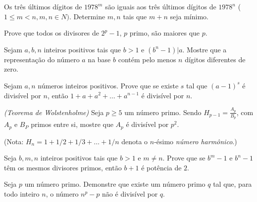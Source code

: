 \begin{questao}
  Os três últimos dígitos de $1978^m$ são iguais aos três
  últimos dígitos de $1978^n$ ($1 \leq m < n, m,n \in
  {N})$. Determine $m,n$ tais que $m+n$ seja mínimo.
\end{questao}

\begin{questao}
  Prove que todos os divisores de $2^p-1$, $p$ primo,
  são maiores que $p$.
\end{questao}

\begin{questao}
  Sejam $a,b,n$ inteiros positivos tais que $b>1$ e
  $(b^n-1)|a$. Mostre que a representação do número $a$ na base
  $b$ contém pelo menos $n$ dígitos diferentes de zero.
\end{questao}

\begin{questao}
  Sejam $a,n$ números inteiros positivos. Prove que se
  existe $s$ tal que $(a-1)^s$ é divisível por $n$, então
  $1+a+a^2+\ldots+a^{n-1}$ é divisível por $n$.
\end{questao}

\begin{questao}
  {\it(Teorema de Wolstenholme)} Seja $p \geq 5$ um número
  primo. Sendo $H_{p-1} = \frac{A_p}{B_p}$, com $A_p$ e $B_P$
  primos entre si, mostre que $A_p$ é divisível por $p^2$.

  (Nota: $H_n=1+1/2+1/3+\ldots+1/n$ denota o $n$-ésimo {\it número
    harmônico}.)
\end{questao}

\begin{questao}
  Seja $b,m,n$ inteiros positivos tais que $b>1$ e $m
  \not = n$. Prove que se $b^m-1$ e $b^n-1$ têm os mesmos
  divisores primos, então $b+1$ é potência de $2$.
\end{questao}

\begin{questao}
  Seja $p$ um número primo. Demonstre que existe um número
  primo $q$ tal que, para todo inteiro $n$, o número $n^p-p$ não
  é divisível por $q$.
\end{questao}

